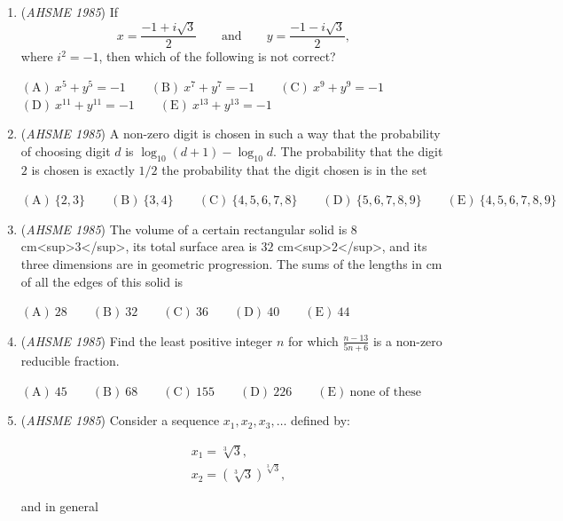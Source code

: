 \begin{enumerate}
$\mathrm{(A)\ } 3 \qquad \mathrm{(B) \ }3+\sqrt{3} \qquad \mathrm{(C) \  } 5-\frac{\sqrt{3}}{2} \qquad \mathrm{(D) \  } 5 \qquad \mathrm{(E) \  }\text{none of the above}$


	\item (\textit{AHSME 1985}) If 
 \[x = \frac{-1+i\sqrt{3}}{2} \qquad\text{and}\qquad y = \frac{-1-i\sqrt{3}}{2},\] where $i^2 = -1$, then which of the following is not correct?


 $\mathrm{(A)\ } x^5+y^5 = -1 \qquad \mathrm{(B) \ }x^7+y^7 = -1 \qquad \mathrm{(C) \  } x^9+y^9 = -1 \qquad$
$\mathrm{(D) \  } x^{11}+y^{11} = -1 \qquad \mathrm{(E) \  }x^{13}+y^{13} = -1$


	\item (\textit{AHSME 1985}) A non-zero digit is chosen in such a way that the probability of choosing digit $d$ is $\log_{10}{(d+1)}-\log_{10}{d}$. The probability that the digit $2$ is chosen is exactly $1/2$ the probability that the digit chosen is in the set


 $\mathrm{(A)\ } \{2,3\} \qquad \mathrm{(B) \ }\{3,4\} \qquad \mathrm{(C) \  } \{4,5,6,7,8\} \qquad \mathrm{(D) \  } \{5,6,7,8,9\} \qquad \mathrm{(E) \  }\{4,5,6,7,8,9\}$


	\item (\textit{AHSME 1985}) The volume of a certain rectangular solid is $8$ cm<sup>3</sup>, its total surface area is $32$ cm<sup>2</sup>, and its three dimensions are in geometric progression. The sums of the lengths in cm of all the edges of this solid is


 $\mathrm{(A)\ } 28 \qquad \mathrm{(B) \ }32 \qquad \mathrm{(C) \  } 36 \qquad \mathrm{(D) \  } 40 \qquad \mathrm{(E) \  }44$


	\item (\textit{AHSME 1985}) Find the least positive integer $n$ for which $\frac{n-13}{5n+6}$ is a non-zero reducible fraction.


 $\mathrm{(A)\ } 45 \qquad \mathrm{(B) \ }68 \qquad \mathrm{(C) \  } 155 \qquad \mathrm{(D) \  } 226 \qquad \mathrm{(E) \  }\text{none of these}$


	\item (\textit{AHSME 1985}) Consider a sequence $x_1,x_2,x_3,\dotsc$ defined by:

 \begin{align*}&x_1 = \sqrt[3]{3}, \\ &x_2 = \left(\sqrt[3]{3}\right)^{\sqrt[3]{3}},\end{align*}

and in general


\end{enumerate}
